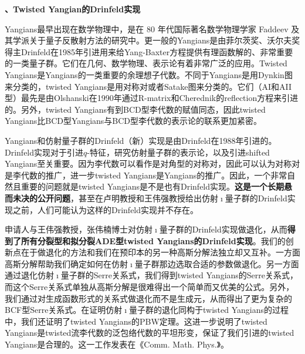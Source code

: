 \documentclass[12pt,UTF8,AutoFakeBold=4,a4paper]{ctexart}
\begin{document}
\medskip

\textbf{、Twisted Yangian的Drinfeld实现}

Yangians最早出现在数学物理中，是在 80 年代国际著名数学物理学家 Faddeev 及其学派关于量子反散射方法的研究中。更一般的Yangians是由菲尔茨奖、沃尔夫奖得主Drinfeld在1985年引进用来给Yang-Baxter方程提供有理函数解的、非常重要的一类量子群。它们在几何、数学物理、表示论有着非常广泛的应用。Twisted Yangians是Yangians的一类重要的余理想子代数。不同于Yangians是用Dynkin图来分类的，twisted Yangians是用对称对或者Satake图来分类的。它们（AI和AII型）最先是由Olshanski在1990年通过R-matrix和Cherednik的reflection方程来引进的。另外，twisted Yangians有到BCD型李代数的赋值同态，因此twisted Yangians比BCD型Yangians与BCD型李代数的表示论的联系更加紧密。

Yangians和仿射量子群的Drinfeld（新）实现是由Drinfeld在1988年引进的。Drinfeld实现对于引进$q$-特征，研究仿射量子群的表示论，以及引进shifted Yangians至关重要。因为李代数可以看作是对角型的对称对，因此可以认为对称对是李代数的推广，进一步twisted Yangians是Yangians的推广。因此，一个非常自然且重要的问题就是twisted Yangians是不是也有Drinfeld实现。\textbf{这是一个长期悬而未决的公开问题}，甚至在卢明教授和王伟强教授给出仿射$\imath$量子群的Drinfeld实现之前，人们可能认为这样的Drinfeld实现并不存在。


申请人与王伟强教授，张伟楠博士对仿射$\imath$量子群的Drinfeld实现做退化，从而\textbf{得到了所有分裂型和拟分裂ADE型twisted Yangians的Drinfeld实现}。我们的创新点在于做退化的方法和我们在预印本的另一种高斯分解法独立却又互补。一方面高斯分解帮助我们确定如何在仿射$\imath$量子群那边选取合适的参数做退化。另一方面通过退化仿射$\imath$量子群的Serre关系式，我们得到twisted Yangians的Serre关系式，而这个Serre关系式单独从高斯分解是很难得出一个简单而又优美的公式。另外，我们通过对生成函数形式的关系式做退化而不是生成元，从而得出了更为复杂的BCF型Serre关系式。在证明仿射$\imath$量子群的退化同构于twisted Yangians的过程中，我们还证明了twisted Yangians的PBW定理。这进一步说明了twisted Yangians是twisted流李代数的泛包络代数的平坦形变，保证了我们引进的twisted Yangians是合理的。这一工作发表在《Comm. Math. Phys.》。
\end{document}

